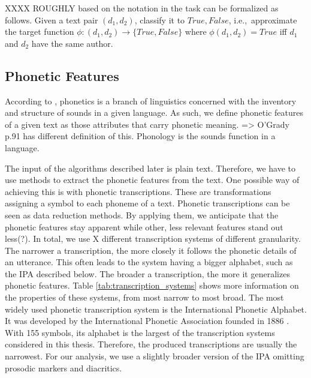 XXXX ROUGHLY based on the notation in \cite{bevendorff2020shared} the task can be formalized as follows.
Given a text pair $(d_1, d_2)$, classify it to ${True, False}$, i.e.,\ approximate the target function $\phi{}:(d_1, d_2)\to\{True, False\}$ where $\phi(d_1, d_2)=True$ iff $d_1$ and $d_2$ have the same author.

\subsection{Phonetic Features}
According to \cite{ogrady2017introToLinguistics}, phonetics is a branch of linguistics concerned with the inventory and structure of sounds in a given language.
As such, we define phonetic features of a given text as those attributes that carry phonetic meaning.
=> O'Grady p.91 has different definition of this.
Phonology is the sounds function in a language.








The input of the algorithms described later is plain text.
Therefore, we have to use methods to extract the phonetic features from the text.
One possible way of achieving this is with phonetic transcriptions.
These are transformations assigning a symbol to each phoneme of a text.
Phonetic transcriptions can be seen as data reduction methods.
By applying them, we anticipate that the phonetic features stay apparent while other, less relevant features stand out less(?).
In total, we use X different transcription systems of different granularity.
The narrower a transcription, the more closely it follows the phonetic details of an utterance.
This often leads to the system having a bigger alphabet, such as the IPA described below.
The broader a transcription, the more it generalizes phonetic features.
Table \ref{tab:transcription_systems} shows more information on the properties of these systems, from most narrow to most broad.
The most widely used phonetic transcription system is the International Phonetic Alphabet. %
It was developed by the International Phonetic Association founded in 1886 \cite{ipa1999ipaHandbook}.
With 155 symbols, its alphabet is the largest of the transcription systems considered in this thesis.
Therefore, the produced transcriptions are usually the narrowest.
For our analysis, we use a slightly broader version of the IPA omitting prosodic markers and diacritics.\\ %

